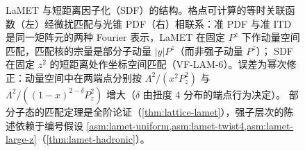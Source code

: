 \begin{figure}[htbp]
\caption{LaMET 与短距离因子化（SDF）的结构。格点可计算的等时关联函数（左）经微扰匹配与光锥 PDF（右）相联系：准 PDF 与准 ITD 是同一矩阵元的两种 Fourier 表示，LaMET 在固定 $P^z$ 下作动量空间匹配，匹配核的宗量是部分子动量 $|y|P^z$（而非强子动量 $P^z$）；
SDF 在固定 $z^2$ 的短距离处作坐标空间匹配（VF-LAM-6）。误差为幂次修正：动量空间中在两端点分别按 $\Lambda^2/(x^2P_z^2)$ 与 $\Lambda^2/((1-x)^{2-\delta}P_z^2)$ 增大（$\delta$ 由扭度 4 分布的端点行为决定）。
部分子态的匹配定理是全阶论证（\cref{thm:lattice-lamet}），强子层次的陈述依赖于编号假设 \cref{asm:lamet-uniform,asm:lamet-twist4,asm:lamet-large-z}（\cref{thm:lamet-hadronic}）。}
\label{fig:lattice-matching}
\end{figure}

